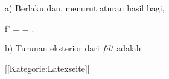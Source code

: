a) Berlaku
 dan, menurut aturan hasil bagi,

\mavergleichskettealign
{\vergleichskettealign
{f'
}
{ =} { {  }
}
{ =} { {  }
}
{ } {
}
{ } {
}
}
{}
{}{.}

b) Turunan eksterior dari $fdt$ adalah

 [[Kategorie:Latexseite]]
